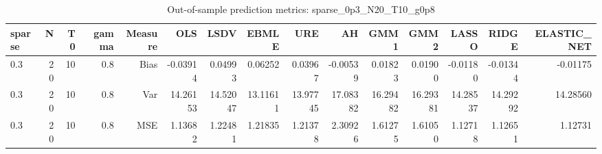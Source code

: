\begin{table}[!htbp]\centering
\caption{Out-of-sample prediction metrics: sparse_0p3_N20_T10_g0p8}
\label{tab:table3_sparse_0p3_N20_T10_g0p8}
\begin{tabular}{lrrrrrrrrrrrrrr}
\hline
sparse & N & T0 & gamma & Measure & OLS & LSDV & EBMLE & URE & AH & GMM1 & GMM2 & LASSO & RIDGE & ELASTIC_NET \\
\hline
0.3 & 20 & 10 & 0.8 & Bias & -0.03914 & 0.04993 & 0.06252 & 0.03967 & -0.00539 & 0.01823 & 0.01900 & -0.01180 & -0.01344 & -0.01175 \\
0.3 & 20 & 10 & 0.8 & Var & 14.26153 & 14.52047 & 13.11611 & 13.97745 & 17.08382 & 16.29482 & 16.29381 & 14.28537 & 14.29292 & 14.28560 \\
0.3 & 20 & 10 & 0.8 & MSE & 1.13682 & 1.22481 & 1.21835 & 1.21378 & 2.30926 & 1.61275 & 1.61050 & 1.12718 & 1.12651 & 1.12731 \\
\hline
\end{tabular}
\end{table}

